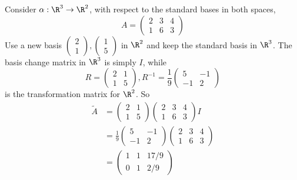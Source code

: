 \documentclass[a4paper]{article}
\begin{document}
\begin{eg}
  Consider $\alpha: \R^3 \to \R^2$, with respect to the standard bases in both spaces,
  \[
  A = 
  \begin{pmatrix}
    2 & 3 & 4\\
    1 & 6 & 3
  \end{pmatrix}
  \]
  Use a new basis $
  \begin{pmatrix}
    2\\1
  \end{pmatrix}, 
  \begin{pmatrix}
    1\\5
  \end{pmatrix}$ in $\R^2$ and keep the standard basis in $\R^3$. The basis change matrix in $\R^3$ is simply $I$, while
  \[
  R = 
  \begin{pmatrix}
    2& 1\\
    1 & 5
  \end{pmatrix}, R^{-1} = \frac{1}{9}
  \begin{pmatrix}
    5 & -1\\
    -1 & 2
  \end{pmatrix}
  \]
  is the transformation matrix for $\R^2$. So
  \begin{align*}
    \tilde{A} &= 
    \begin{pmatrix}
      2 & 1\\1 & 5
    \end{pmatrix}
    \begin{pmatrix}
      2 & 3 & 4\\1 & 6 & 3
    \end{pmatrix}I\\
    &= \frac{1}{9}
    \begin{pmatrix}
      5 & -1\\
      -1 & 2
    \end{pmatrix}
    \begin{pmatrix}
      2 & 3 & 4\\1 & 6 & 3
    \end{pmatrix}\\
    &= 
    \begin{pmatrix}
      1 & 1 & 17/9\\
      0 & 1 & 2/9
    \end{pmatrix}
  \end{align*}


\end{eg}
\end{document}
